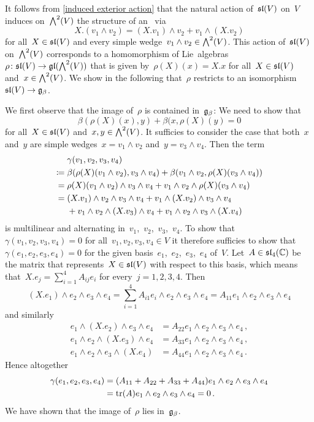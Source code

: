 It follows from \cref{induced exterior action} that the natural action of~$\mathfrak{sl}(V)$ on~$V$ induces on~$\exterior[2]{V}$ the structure of an~{} via
\[
  X.(v_1 \wedge v_2)
  =
  (X.v_1) \wedge v_2 + v_1 \wedge (X.v_2)
\]
for all~$X \in \mathfrak{sl}(V)$ and every simple wedge~$v_1 \wedge v_2 \in \exterior[2]{V}$.
This action of~$\mathfrak{sl}(V)$ on~$\exterior[2]{V}$ corresponds to a homomorphism of Lie~algebras~$\rho \colon \sllie(V) \to \gllie(\exterior[2]{V})$ that is given by~$\rho(X)(x) = X.x$ for all~$X \in \mathfrak{sl}(V)$ and~$x \in \exterior[2]{V}$.
We show in the following that~$\rho$ restricts to an isomorphism~$\mathfrak{sl}(V) \to \mathfrak{g}_\beta$.

We first observe that the image of~$\rho$ is contained in~$\mathfrak{g}_\beta$:
We need to show that
\[
  \beta(\rho(X)(x), y) + \beta(x, \rho(X)(y)
  =
  0
\]
for all~$X \in \mathfrak{sl}(V)$ and~$x, y \in \exterior[2]{V}$.
It sufficies to consider the case that both~$x$ and~$y$ are simple wedges~$x = v_1 \wedge v_2$ and~$y = v_3 \wedge v_4$.
Then the term
\begin{align*}
  {}&
  \gamma(v_1, v_2, v_3, v_4)
  \\
  \coloneqq{}&
    \beta(\rho(X)(v_1 \wedge v_2), v_3 \wedge v_4)
  + \beta(v_1 \wedge v_2, \rho(X)(v_3 \wedge v_4))
  \\
  ={}&
    \rho(X)(v_1 \wedge v_2) \wedge v_3 \wedge v_4
  + v_1 \wedge v_2 \wedge \rho(X)(v_3 \wedge v_4)
  \\
  ={}&
    (X.v_1) \wedge v_2 \wedge v_3 \wedge v_4
  + v_1 \wedge (X.v_2) \wedge v_3 \wedge v_4
  \\
  {}&
  + v_1 \wedge v_2 \wedge (X.v_3) \wedge v_4
  + v_1 \wedge v_2 \wedge v_3 \wedge (X.v_4)
\end{align*}
is multilinear and alternating in~$v_1$,~$v_2$,~$v_3$,~$v_4$.
To show that~$\gamma(v_1, v_2, v_3, v_4) = 0$ for all~$v_1, v_2, v_3, v_4 \in V$ it therefore sufficies to show that~$\gamma(e_1, e_2, e_3, e_4) = 0$ for the given basis~$e_1$,~$e_2$,~$e_3$,~$e_4$ of~$V$.
Let~$A \in \mathfrak{sl}_4(\mathbb{C})$ be the matrix that represents~$X \in \mathfrak{sl}(V)$ with respect to this basis, which means that~$X.e_j = \sum_{i=1}^4 A_{ij} e_i$ for every~$j = 1, 2, 3, 4$.
Then
\[
  (X.e_1) \wedge e_2 \wedge e_3 \wedge e_4
  =
  \sum_{i=1}^4 A_{i1} e_i \wedge e_2 \wedge e_3 \wedge e_4
  =
  A_{11} e_1 \wedge e_2 \wedge e_3 \wedge e_4
\]
and similarly
\begin{align*}
  e_1 \wedge (X.e_2) \wedge e_3 \wedge e_4
  &=
  A_{22} e_1 \wedge e_2 \wedge e_3 \wedge e_4 \,,
  \\
  e_1 \wedge e_2 \wedge (X.e_3) \wedge e_4
  &=
  A_{33} e_1 \wedge e_2 \wedge e_3 \wedge e_4 \,,
  \\
  e_1 \wedge e_2 \wedge e_3 \wedge (X.e_4)
  &=
  A_{44} e_1 \wedge e_2 \wedge e_3 \wedge e_4 \,.
\end{align*}
Hence altogether
\begin{align*}
  \gamma(e_1, e_2, e_3, e_4)
  &=
  (A_{11} + A_{22} + A_{33} + A_{44}) e_1 \wedge e_2 \wedge e_3 \wedge e_4
  \\
  &=
  \operatorname{tr}(A) e_1 \wedge e_2 \wedge e_3 \wedge e_4
  =
  0 \,.
\end{align*}
We have shown that the image of~$\rho$ lies in~$\mathfrak{g}_\beta$.

